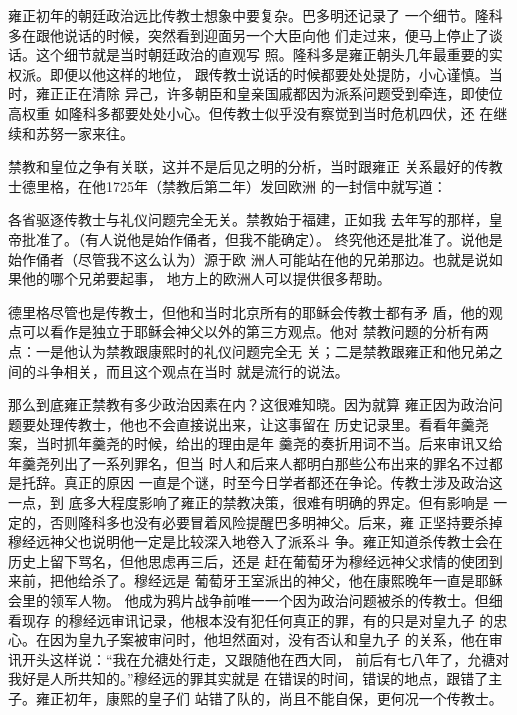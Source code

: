 雍正初年的朝廷政治远比传教士想象中要复杂。巴多明还记录了%
一个细节。隆科多在跟他说话的时候，突然看到迎面另一个大臣向他%
们走过来，便马上停止了谈话。这个细节就是当时朝廷政治的直观写%
照。隆科多是雍正朝头几年最重要的实权派。即便以他这样的地位，%
跟传教士说话的时候都要处处提防，小心谨慎。当时，雍正正在清除%
异己，许多朝臣和皇亲国戚都因为派系问题受到牵连，即使位高权重%
如隆科多都要处处小心。但传教士似乎没有察觉到当时危机四伏，还%
在继续和苏努一家来往。%
\par
禁教和皇位之争有关联，这并不是后见之明的分析，当时跟雍正%
关系最好的传教士德里格，在他1725年（禁教后第二年）发回欧洲%
的一封信中就写道：%
\par
{\bookkai 各省驱逐传教士与礼仪问题完全无关。禁教始于福建，正如我}%
{\bookkai 去年写的那样，皇帝批准了。（有人说他是始作俑者，但我不能确定）。}%
{\bookkai 终究他还是批准了。说他是始作俑者（尽管我不这么认为）源于欧}%
{\bookkai 洲人可能站在他的兄弟那边。也就是说如果他的哪个兄弟要起事，}%
{\bookkai 地方上的欧洲人可以提供很多帮助。}%
\par
德里格尽管也是传教士，但他和当时北京所有的耶稣会传教士都有矛%
盾，他的观点可以看作是独立于耶稣会神父以外的第三方观点。他对%
禁教问题的分析有两点：一是他认为禁教跟康熙时的礼仪问题完全无%
关；二是禁教跟雍正和他兄弟之间的斗争相关，而且这个观点在当时%
就是流行的说法。%
\par
那么到底雍正禁教有多少政治因素在内？这很难知晓。因为就算%
雍正因为政治问题要处理传教士，他也不会直接说出来，让这事留在%
历史记录里。看看年羹尧案，当时抓年羹尧的时候，给出的理由是年%
羹尧的奏折用词不当。后来审讯又给年羹尧列出了一系列罪名，但当%
时人和后来人都明白那些公布出来的罪名不过都是托辞。真正的原因%
一直是个谜，时至今日学者都还在争论。传教士涉及政治这一点，到%
底多大程度影响了雍正的禁教决策，很难有明确的界定。但有影响是%
一定的，否则隆科多也没有必要冒着风险提醒巴多明神父。后来，雍%
正坚持要杀掉穆经远神父也说明他一定是比较深入地卷入了派系斗%
争。雍正知道杀传教士会在历史上留下骂名，但他思虑再三后，还是%
赶在葡萄牙为穆经远神父求情的使团到来前，把他给杀了。穆经远是%
葡萄牙王室派出的神父，他在康熙晚年一直是耶稣会里的领军人物。%
他成为鸦片战争前唯一一个因为政治问题被杀的传教士。但细看现存%
的穆经远审讯记录，他根本没有犯任何真正的罪，有的只是对皇九子%
的忠心。在因为皇九子案被审问时，他坦然面对，没有否认和皇九子%
的关系，他在审讯开头这样说：“我在允禟处行走，又跟随他在西大同，%
前后有七八年了，允禟对我好是人所共知的。”穆经远的罪其实就是%
在错误的时间，错误的地点，跟错了主子。雍正初年，康熙的皇子们%
站错了队的，尚且不能自保，更何况一个传教士。%
